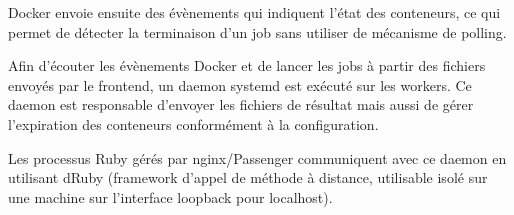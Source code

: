 Docker envoie ensuite des évènements qui indiquent l'état des conteneurs, ce qui permet de détecter la terminaison d'un
job sans utiliser de mécanisme de polling.

Afin d'écouter les évènements Docker et de lancer les jobs à partir des fichiers envoyés par le frontend, un daemon
systemd est exécuté sur les workers. Ce daemon est responsable d'envoyer les fichiers de résultat mais aussi de gérer
l'expiration des conteneurs conformément à la configuration.

Les processus Ruby gérés par nginx/Passenger communiquent avec ce daemon en utilisant dRuby (framework d'appel de
méthode à distance, utilisable isolé sur une machine sur l'interface loopback pour localhost).

